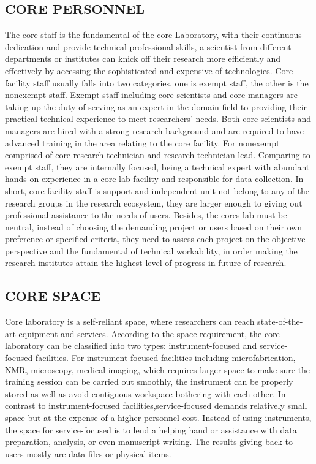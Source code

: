 \documentclass[12pt]{article}
\begin{document}
\subsection{CORE PERSONNEL}
The core staff is the fundamental of the core Laboratory, with their continuous dedication and provide technical professional skills, a scientist from different departments or institutes can knick off their research more efficiently and effectively by accessing the sophisticated and expensive of technologies. Core facility staff usually falls into two categories, one is exempt staff, the other is the nonexempt staff. Exempt staff including core scientists and core managers are taking up the duty of serving as an expert in the domain field to providing their practical technical experience to meet researchers' needs. Both core scientists and managers are hired with a strong research background and are required to have advanced training in the area relating to the core facility. For nonexempt comprised of core research technician and research technician lead. Comparing to exempt staff, they are internally focused, being a technical expert with abundant hands-on experience in a core lab facility and responsible for data collection. In short, core facility staff is support and independent unit not belong to any of the research groups in the research ecosystem, they are larger enough to giving out professional assistance to the needs of users. Besides, the cores lab must be neutral, instead of choosing the demanding project or users based on their own preference or specified criteria, they need to assess each project on the objective perspective and the fundamental of technical workability, in order making the research institutes attain the highest level of progress in future of research.


\subsection{CORE SPACE}
Core laboratory is a self-reliant space, where researchers can reach state-of-the-art equipment and services. According to the space requirement, the core laboratory can be classified into two types: instrument-focused and service-focused facilities. For instrument-focused facilities including microfabrication, NMR, microscopy, medical imaging, which requires larger space to make sure the training session can be carried out smoothly, the instrument can be properly stored as well as avoid contiguous workspace bothering with each other. In contrast to instrument-focused facilities,service-focused demands relatively small space but at the expense of a higher personnel cost. Instead of using instruments, the space for service-focused is to lend a helping hand or assistance with data preparation, analysis, or even manuscript writing. The results giving back to users mostly are data files or physical items.
\end{document}
